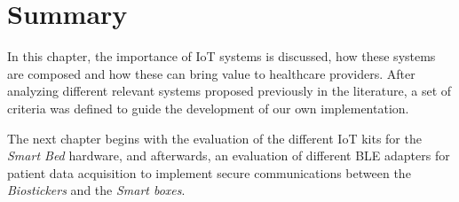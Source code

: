 \section{Summary}
In this chapter, the importance of \acs{IoT} systems is discussed, how these systems are composed and how these can bring value to healthcare providers. After analyzing different relevant systems proposed previously in the literature, a set of criteria was defined to guide the development of our own implementation.

\bigskip

The next chapter begins with the evaluation of the different \acs{IoT} kits for the \textit{Smart Bed} hardware, and afterwards, an evaluation of different \acs{BLE} adapters for patient data acquisition to implement secure communications between the \textit{Biostickers} and the \textit{Smart boxes}. 




\bigskip